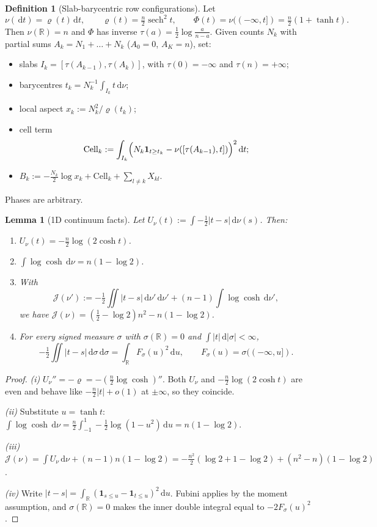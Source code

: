 \documentclass[11pt]{article}
\newtheorem{lemma}[theorem]{Lemma}
\theoremstyle{definition}
\newtheorem{definition}[theorem]{Definition}
\theoremstyle{remark}
\newcommand{\R}{\mathbb R}
\newcommand{\dd}{\,\mathrm d}
\begin{document}
\begin{definition}[Slab-barycentric row configurations]\label{def:slab}
Let
\[
\nu(\dd t)=\varrho(t)\dd t,\qquad \varrho(t)=\tfrac n2\operatorname{sech}^2t,\qquad
\Phi(t)=\nu((-\infty,t])=\tfrac n2(1+\tanh t).
\]
Then $\nu(\R)=n$ and $\Phi$ has inverse $\tau(a)=\tfrac12\log\frac a{n-a}$. Given counts $N_k$ with
partial sums $A_k=N_1+\dots+N_k$ ($A_0=0$, $A_K=n$), set:
\begin{itemize}[leftmargin=*]
\item slabs $I_k=[\tau(A_{k-1}),\tau(A_k)]$, with $\tau(0)=-\infty$ and $\tau(n)=+\infty$;
\item barycentres $t_k=N_k^{-1}\int_{I_k}t\dd\nu$;
\item local aspect $x_k:=N_k^2/\varrho(t_k)$;
\item cell term
  \[
  \mathrm{Cell}_k:=\int_{I_k}\Bigl(N_k\mathbf 1_{t\ge t_k}-\nu([\tau(A_{k-1}),t])\Bigr)^2\dd t ;
  \]
\item $B_k:=-\tfrac{N_k}2\log x_k+\mathrm{Cell}_k+\sum_{l\ne k}X_{kl}$.
\end{itemize}
Phases are arbitrary.
\end{definition}

\begin{lemma}[1D continuum facts]\label{lem:1d}
Let $U_\nu(t):=\int-\tfrac12|t-s|\dd\nu(s)$. Then:
\begin{enumerate}[label=(\roman*)]
\item $U_\nu(t)=-\tfrac n2\log(2\cosh t)$.
\item $\int\log\cosh\dd\nu=n(1-\log2)$.
\item With
  \[
  \mathcal J(\nu'):=-\tfrac12\iint|t-s|\dd\nu'\dd\nu'+(n-1)\int\log\cosh\dd\nu',
  \]
  we have $\mathcal J(\nu)=(\tfrac12-\log2)n^2-n(1-\log2)$.
\item For every signed measure $\sigma$ with $\sigma(\R)=0$ and $\int|t|\dd|\sigma|<\infty$,
  \[
  -\tfrac12\iint|t-s|\dd\sigma\dd\sigma=\int_\R F_\sigma(u)^2\dd u,\qquad F_\sigma(u)=\sigma((-\infty,u]).
  \]
\end{enumerate}
\end{lemma}
\begin{proof}
\emph{(i)} $U_\nu''=-\varrho=-(\tfrac n2\log\cosh)''$. Both $U_\nu$ and
$-\tfrac n2\log(2\cosh t)$ are even and behave like $-\tfrac n2|t|+o(1)$ at $\pm\infty$, so they
coincide.

\emph{(ii)} Substitute $u=\tanh t$:
$\int\log\cosh\dd\nu=\tfrac n2\int_{-1}^1-\tfrac12\log(1-u^2)\dd u=n(1-\log2)$.

\emph{(iii)}
$\mathcal J(\nu)=\int U_\nu\dd\nu+(n-1)n(1-\log2)=-\tfrac{n^2}{2}(\log2+1-\log2)+(n^2-n)(1-\log2)$.

\emph{(iv)} Write $|t-s|=\int_\R(\mathbf 1_{s\le u}-\mathbf 1_{t\le u})^2\dd u$. Fubini applies by the
moment assumption, and $\sigma(\R)=0$ makes the inner double integral equal to $-2F_\sigma(u)^2$.
\end{proof}
\end{document}
